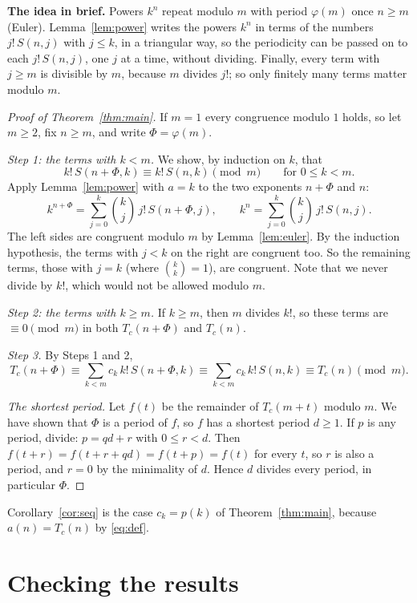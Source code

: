 \documentclass[11pt,a4paper]{article}
\theoremstyle{definition}
\theoremstyle{remark}
\newcommand{\para}[1]{\par\medskip\noindent\textbf{#1}\enspace}
\begin{document}
\para{The idea in brief.} Powers $k^n$ repeat modulo $m$ with period $\varphi(m)$ once $n\ge m$ (Euler).
Lemma~\ref{lem:power} writes the powers $k^n$ in terms of the numbers $j!\,S(n,j)$ with $j\le k$, in a triangular way, so
the periodicity can be passed on to each $j!\,S(n,j)$, one $j$ at a time, without dividing. Finally, every term with
$j\ge m$ is divisible by $m$, because $m$ divides $j!$; so only finitely many terms matter modulo $m$.

\begin{proof}[Proof of Theorem~\ref{thm:main}]
If $m=1$ every congruence modulo $1$ holds, so let $m\ge2$, fix $n\ge m$, and write $\Phi=\varphi(m)$.

\emph{Step 1: the terms with $k<m$.} We show, by induction on $k$, that
\[
k!\,S(n+\Phi,k)\equiv k!\,S(n,k)\pmod m\qquad\text{for }0\le k<m.
\]
Apply Lemma~\ref{lem:power} with $a=k$ to the two exponents $n+\Phi$ and $n$:
\[
k^{n+\Phi}=\sum_{j=0}^{k}\binom kj\,j!\,S(n+\Phi,j),\qquad
k^{n}=\sum_{j=0}^{k}\binom kj\,j!\,S(n,j).
\]
The left sides are congruent modulo $m$ by Lemma~\ref{lem:euler}. By the induction hypothesis, the terms with $j<k$ on the
right are congruent too. So the remaining terms, those with $j=k$ (where $\binom kk=1$), are congruent. Note that we never
divide by $k!$, which would not be allowed modulo $m$.

\emph{Step 2: the terms with $k\ge m$.} If $k\ge m$, then $m$ divides $k!$, so these terms are $\equiv0\pmod m$ in both
$T_c(n+\Phi)$ and $T_c(n)$.

\emph{Step 3.} By Steps 1 and 2,
\[
T_c(n+\Phi)\equiv\sum_{k<m}c_k\,k!\,S(n+\Phi,k)\equiv\sum_{k<m}c_k\,k!\,S(n,k)\equiv T_c(n)\pmod m .
\]

\emph{The shortest period.} Let $f(t)$ be the remainder of $T_c(m+t)$ modulo $m$. We have shown that $\Phi$ is a period of
$f$, so $f$ has a shortest period $d\ge1$. If $p$ is any period, divide: $p=qd+r$ with $0\le r<d$. Then
$f(t+r)=f(t+r+qd)=f(t+p)=f(t)$ for every $t$, so $r$ is also a period, and $r=0$ by the minimality of $d$. Hence $d$
divides every period, in particular $\Phi$.
\end{proof}

Corollary~\ref{cor:seq} is the case $c_k=p(k)$ of Theorem~\ref{thm:main}, because $a(n)=T_c(n)$ by \eqref{eq:def}.

\section{Checking the results}\label{sec:checks}
\end{document}
